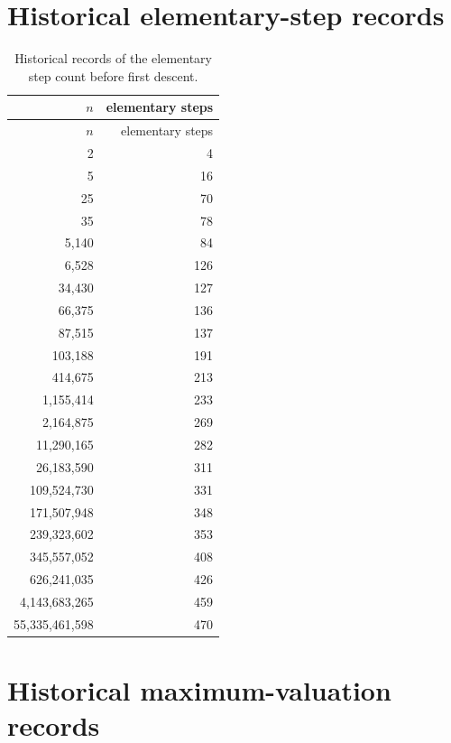 \documentclass[11pt]{article}
\theoremstyle{definition}
\begin{document}
\section{Historical elementary-step records}

\begin{longtable}{r r}
\caption{Historical records of the elementary step count before first descent.}\\
\toprule
$n$ & elementary steps\\
\midrule
\endfirsthead
\toprule
$n$ & elementary steps\\
\midrule
\endhead
2 & 4 \\
5 & 16 \\
25 & 70 \\
35 & 78 \\
5{,}140 & 84 \\
6{,}528 & 126 \\
34{,}430 & 127 \\
66{,}375 & 136 \\
87{,}515 & 137 \\
103{,}188 & 191 \\
414{,}675 & 213 \\
1{,}155{,}414 & 233 \\
2{,}164{,}875 & 269 \\
11{,}290{,}165 & 282 \\
26{,}183{,}590 & 311 \\
109{,}524{,}730 & 331 \\
171{,}507{,}948 & 348 \\
239{,}323{,}602 & 353 \\
345{,}557{,}052 & 408 \\
626{,}241{,}035 & 426 \\
4{,}143{,}683{,}265 & 459 \\
55{,}335{,}461{,}598 & 470 \\
\bottomrule
\end{longtable}

\section{Historical maximum-valuation records}
\end{document}
